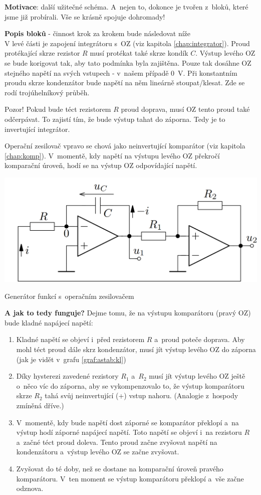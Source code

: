 \documentclass[a4paper,12pt]{article}   %
\begin{document}
\textbf{Motivace}: další užitečné schéma. A~nejen to, dokonce je tvořen z~bloků, které jsme již probírali. Vše se krásně spojuje dohromady!

\textbf{Popis bloků }- činnost krok za krokem bude následovat níže\\
V levé části je zapojení integrátoru s~OZ (viz kapitola \ref{chap:integrator}). Proud protékající skrze rezistor $R$ musí protékat také skrze kondík $C$. Výstup levého OZ se bude korigovat tak, aby tato podmínka byla zajištěna. Pouze tak dosáhne OZ stejného napětí na svých vstupech - v~našem případě 0~V. Při konstantním proudu skrze kondenzátor bude napětí na něm lineárně stoupat/klesat. Zde se rodí trojúhelníkový průběh.

Pozor! Pokud bude téct rezistorem $R$ proud doprava, musí OZ tento proud také odčerpávat. To zajistí tím, že bude výstup tahat do záporna. Tedy je to invertující integrátor.

Operační zesilovač vpravo se chová jako neinvertující komparátor (viz kapitola \ref{chap:komp}). V~momentě, kdy napětí na výstupu levého OZ překročí komparační úroveň, hodí se na výstup OZ odpovídající napětí.
\begin{schema}[h!]
    \centering
    \includegraphics[width=.7\textwidth]{gen_funct.PNG}
    \caption{Generátor funkcí s~operačním zesilovačem}
    \label{sch:gen:fci}
\end{schema}

\textbf{A jak to tedy funguje?} Dejme tomu, že na výstupu komparátoru (pravý OZ) bude kladné napájecí napětí:
\begin{enumerate}
    \item Kladné napětí se objeví i~před rezistorem $R$ a~proud poteče doprava. Aby mohl téct proud dále skrz kondenzátor, musí jít výstup levého OZ do záporna (jak je vidět v~grafu \ref{graf:astab:kl})
    \item Díky hysterezi zavedené rezistory $R_1$ a~$R_2$ musí jít výstup levého OZ ještě o~něco víc do záporna, aby se vykompenzovalo to, že výstup komparátoru skrze $R_2$ tahá svůj neinvertující (+) vstup nahoru. (Analogie z~hospody zmíněná dříve.)
    \item V~momentě, kdy bude napětí dost záporné se komparátor překlopí a~na výstup hodí záporné napájecí napětí. Toto napětí se objeví i~na rezistoru $R$ a~začné téct proud doleva. Tento proud začne zvyšovat napětí na kondenzátoru a~výstup levého OZ se začne zvyšovat.
    \item Zvyšovat do té doby, než se dostane na komparační úroveň pravého komparátoru. V~ten moment se výstup komparátoru překlopí a~vše začne odznova.
\end{enumerate}
\end{document}
